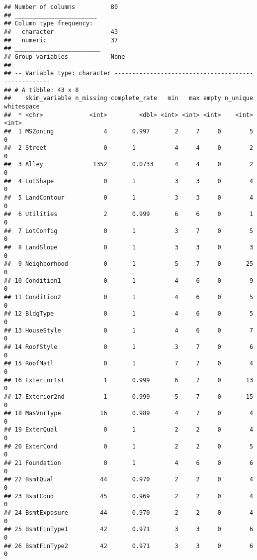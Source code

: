 \documentclass[
]{article}
\begin{document}
\begin{verbatim}
## Number of columns          80    
## _______________________          
## Column type frequency:           
##   character                43    
##   numeric                  37    
## ________________________         
## Group variables            None  
## 
## -- Variable type: character ----------------------------------------------------
## # A tibble: 43 x 8
##    skim_variable n_missing complete_rate   min   max empty n_unique whitespace
##  * <chr>             <int>         <dbl> <int> <int> <int>    <int>      <int>
##  1 MSZoning              4       0.997       2     7     0        5          0
##  2 Street                0       1           4     4     0        2          0
##  3 Alley              1352       0.0733      4     4     0        2          0
##  4 LotShape              0       1           3     3     0        4          0
##  5 LandContour           0       1           3     3     0        4          0
##  6 Utilities             2       0.999       6     6     0        1          0
##  7 LotConfig             0       1           3     7     0        5          0
##  8 LandSlope             0       1           3     3     0        3          0
##  9 Neighborhood          0       1           5     7     0       25          0
## 10 Condition1            0       1           4     6     0        9          0
## 11 Condition2            0       1           4     6     0        5          0
## 12 BldgType              0       1           4     6     0        5          0
## 13 HouseStyle            0       1           4     6     0        7          0
## 14 RoofStyle             0       1           3     7     0        6          0
## 15 RoofMatl              0       1           7     7     0        4          0
## 16 Exterior1st           1       0.999       6     7     0       13          0
## 17 Exterior2nd           1       0.999       5     7     0       15          0
## 18 MasVnrType           16       0.989       4     7     0        4          0
## 19 ExterQual             0       1           2     2     0        4          0
## 20 ExterCond             0       1           2     2     0        5          0
## 21 Foundation            0       1           4     6     0        6          0
## 22 BsmtQual             44       0.970       2     2     0        4          0
## 23 BsmtCond             45       0.969       2     2     0        4          0
## 24 BsmtExposure         44       0.970       2     2     0        4          0
## 25 BsmtFinType1         42       0.971       3     3     0        6          0
## 26 BsmtFinType2         42       0.971       3     3     0        6          0

\end{verbatim}
\end{document}
